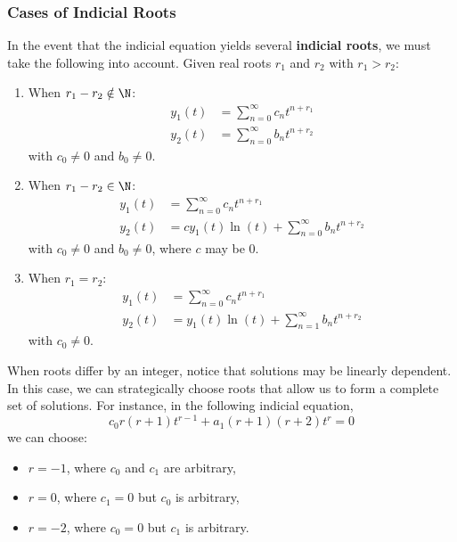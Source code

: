 \documentclass{article}
\begin{document}
\subsubsection{Cases of Indicial Roots}
In the event that the indicial equation yields several \textbf{indicial roots}, we must take the following into account.
Given real roots \(r_1\) and \(r_2\) with \(r_1 > r_2\):
\begin{enumerate}
    \item When \(r_1 - r_2 \notin \N\):
    \begin{align*}
        y_1\left( t \right) & = \sum_{n = 0}^\infty c_n t^{n + r_1} \\
        y_2\left( t \right) & = \sum_{n = 0}^\infty b_n t^{n + r_2}
    \end{align*}
    with \(c_0 \neq 0\) and \(b_0 \neq 0\).
    \item When \(r_1 - r_2 \in \N\):
    \begin{align*}
        y_1\left( t \right) & = \sum_{n = 0}^\infty c_n t^{n + r_1} \\
        y_2\left( t \right) & = c y_1\left( t \right) \ln\left( t \right) + \sum_{n = 0}^\infty b_n t^{n + r_2}
    \end{align*}
    with \(c_0 \neq 0\) and \(b_0 \neq 0\), where \(c\) may be 0.
    \item When \(r_1 = r_2\):
    \begin{align*}
        y_1\left( t \right) & = \sum_{n = 0}^\infty c_n t^{n + r_1} \\
        y_2\left( t \right) & = y_1\left( t \right) \ln\left( t \right) + \sum_{n = 1}^\infty b_n t^{n + r_2}
    \end{align*}
    with \(c_0 \neq 0\).
\end{enumerate}
When roots differ by an integer, notice that solutions may be linearly dependent. In this case, we can
strategically choose roots that allow us to form a complete set of solutions.
For instance, in the following indicial equation,
\begin{equation*}
    c_0 r \left( r + 1 \right) t^{r - 1} + a_1 \left( r + 1 \right) \left( r + 2 \right) t^r = 0
\end{equation*}
we can choose:
\begin{itemize}
    \item \(r = -1\), where \(c_0\) and \(c_1\) are arbitrary,
    \item \(r = 0\), where \(c_1 = 0\) but \(c_0\) is arbitrary,
    \item \(r = -2\), where \(c_0 = 0\) but \(c_1\) is arbitrary.
\end{itemize}
\end{document}

